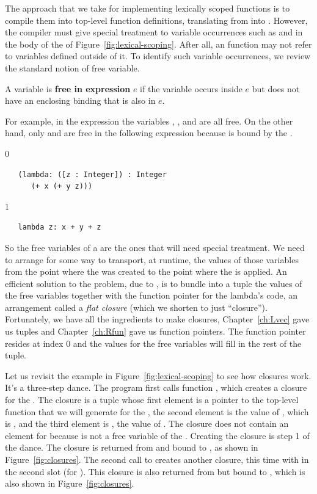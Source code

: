 \documentclass[7x10]{TimesAPriori_MIT}%
\def\racketEd{0}
\def\pythonEd{1}
\def\edition{1}
\begin{document}
The approach that we take for implementing lexically scoped functions
is to compile them into top-level function definitions, translating
from \LangLam{} into \LangFun{}.  However, the compiler must give
special treatment to variable occurrences such as  and
 in the body of the  of
Figure~\ref{fig:lexical-scoping}. After all, an \LangFun{} function
may not refer to variables defined outside of it. To identify such
variable occurrences, we review the standard notion of free variable.

\begin{definition}
A variable is \textbf{free in expression} $e$ if the variable occurs
inside $e$ but does not have an enclosing binding that is also in
$e$.
\end{definition}

For example, in the expression  the variables
, , and  are all free.  On the other hand,
only  and  are free in the following expression
because  is bound by the .
{\if\edition\racketEd
\begin{lstlisting}
   (lambda: ([z : Integer]) : Integer
      (+ x (+ y z)))
\end{lstlisting}
\fi}
{\if\edition\pythonEd
\begin{lstlisting}
   lambda z: x + y + z
\end{lstlisting}
\fi}
So the free variables of a  are the ones that will need
special treatment. We need to arrange for some way to transport, at
runtime, the values of those variables from the point where the
 was created to the point where the  is
applied. An efficient solution to the problem, due to
\citet{Cardelli:1983aa}, is to bundle into a tuple the values of the
free variables together with the function pointer for the lambda's
code, an arrangement called a \emph{flat closure} (which we shorten to
just ``closure'').   Fortunately,
we have all the ingredients to make closures, Chapter~\ref{ch:Lvec}
gave us tuples and Chapter~\ref{ch:Rfun} gave us function
pointers. The function pointer resides at index $0$ and the
values for the free variables will fill in the rest of the tuple.

Let us revisit the example in Figure~\ref{fig:lexical-scoping} to see
how closures work. It's a three-step dance. The program first calls
function , which creates a closure for the . The
closure is a tuple whose first element is a pointer to the top-level
function that we will generate for the , the second
element is the value of , which is , and the third
element is , the value of . The closure does not
contain an element for  because  is not a free
variable of the . Creating the closure is step 1 of the
dance. The closure is returned from  and bound to , as
shown in Figure~\ref{fig:closures}.
%
The second call to  creates another closure, this time with
 in the second slot (for ). This closure is also
returned from  but bound to , which is also shown in
Figure~\ref{fig:closures}.
\end{document}
